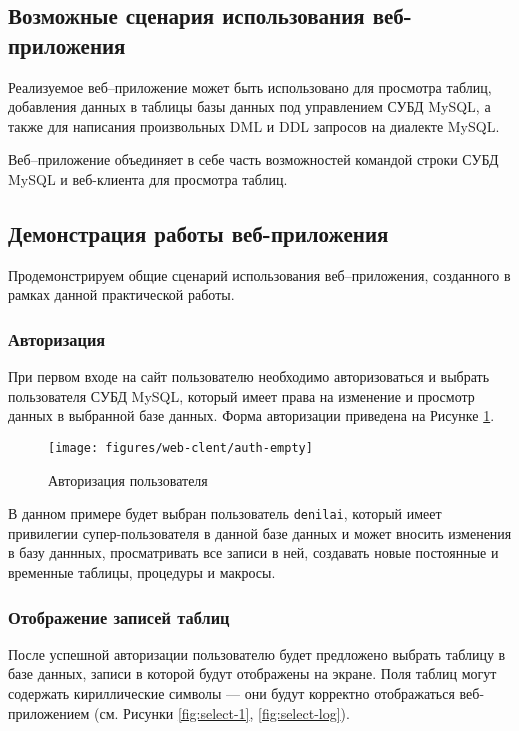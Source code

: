\subsection{Возможные сценария использования веб-приложения}

Реализуемое веб--приложение может быть использовано для просмотра таблиц, добавления данных в таблицы базы данных под управлением СУБД MySQL, а также для написания произвольных DML и DDL запросов на диалекте MySQL. 

Веб--приложение объединяет в себе часть возможностей командой строки СУБД MySQL и веб-клиента для просмотра таблиц.


\subsection{Демонстрация работы веб-приложения}

Продемонстрируем общие сценарий использования веб--приложения, созданного в рамках данной практической работы. 

\subsubsection{Авторизация}
При первом входе на сайт пользователю необходимо авторизоваться и выбрать пользователя СУБД MySQL, который имеет права на изменение и просмотр данных в выбранной базе данных. Форма авторизации приведена на Рисунке \ref{fig:auth-empty}.
\begin{figure}[h!]
	\centering
	\texttt{[image: figures/web-clent/auth-empty]}
	\caption{Авторизация пользователя}
	\label{fig:auth-empty}
\end{figure}


 В данном примере будет выбран пользователь \texttt{denilai}, который имеет привилегии супер-пользователя в данной базе данных и может вносить изменения в базу даннных, просматривать все записи в ней, создавать новые постоянные и временные таблицы, процедуры и макросы.



\subsubsection{Отображение записей таблиц}
После успешной авторизации пользователю будет предложено выбрать таблицу в базе данных, записи в которой будут отображены на экране. Поля таблиц могут содержать кириллические символы --- они будут корректно отображаться веб-приложением (см. Рисунки \ref{fig:select-1}, \ref{fig:select-log}). %

